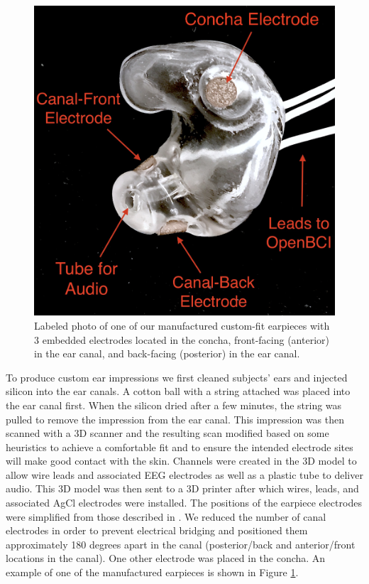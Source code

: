 \documentclass{sigchi}
\begin{document}
\begin{figure}[t]
\centering
\includegraphics[width=.75\linewidth]{./figures/CFEEEG_piecefig_Right.jpg}
\caption{Labeled photo of one of our manufactured custom-fit earpieces with 3 embedded electrodes located in the concha, front-facing (anterior) in the ear canal, and back-facing (posterior) in the ear canal.}
\label{fig:earpiece_diagram}
\end{figure}

To produce custom ear impressions we first cleaned subjects' ears and injected silicon into the ear canals. A cotton ball with a string attached was placed into the ear canal first. When the silicon dried after a few minutes, the string was pulled to remove the impression from the ear canal. This impression was then scanned with a 3D scanner and the resulting scan modified based on some heuristics to achieve a comfortable fit and to ensure the intended electrode sites will make good contact with the skin. Channels were created in the 3D model to allow wire leads and associated EEG electrodes as well as a plastic tube to deliver audio. This 3D model was then sent to a 3D printer after which wires, leads, and associated AgCl electrodes were installed. The positions of the earpiece electrodes were simplified from those described in \cite{Mikkelsen2015}. We reduced the number of canal electrodes in order to prevent electrical bridging and positioned them approximately 180 degrees apart in the canal (posterior/back and anterior/front locations in the canal). One other electrode was placed in the concha. An example of one of the manufactured earpieces is shown in Figure \ref{fig:earpiece_diagram}.
\end{document}
